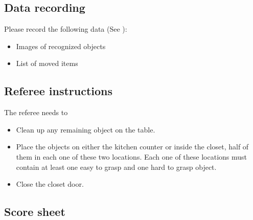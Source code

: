 \subsection{Data recording}
  Please record the following data (See ):
  \begin{itemize}
   \item Images of recognized objects
   \item List of moved items
  \end{itemize}

\subsection{Referee instructions}

The referee needs to
\begin{itemize}
\item Clean up any remaining object on the table.
\item Place the objects on either the kitchen counter or inside the closet, half of them in each one of these two locations. Each one of these locations must contain at least one easy to grasp and one hard to grasp object.
\item Close the closet door.
\end{itemize}

\subsection{Score sheet}


